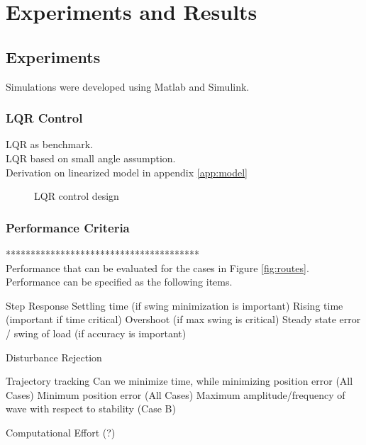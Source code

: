 \chapter{Experiments and Results}\label{ch:results}

\section{Experiments}
Simulations were developed using Matlab and Simulink.\\



\subsection{LQR Control}
LQR as benchmark.\\
LQR based on small angle assumption.\\
Derivation on linearized model in appendix \ref{app:model}

\begin{figure}[h!]
	\centering
	\caption{LQR control design\label{fig:}}
\end{figure}		


\subsection{Performance Criteria}
***************************************\\
Performance that can be evaluated for the cases in Figure \ref{fig:routes}. Performance can be specified as the following items.
\begin{outline}
	\1 Step Response
	\2 Settling time (if swing minimization is important)
	\2 Rising time (important if time critical)
	\2 Overshoot (if max swing is critical)
	\2 Steady state error / swing of load (if accuracy is important)
	
	\1 Disturbance Rejection
	
	\1 Trajectory tracking
	\2 Can we minimize time, while minimizing position error (All Cases)
	\2 Minimum position error (All Cases)
	\2 Maximum amplitude/frequency of wave with respect to stability (Case B)
	
	\1 Computational Effort (?)
\end{outline}

